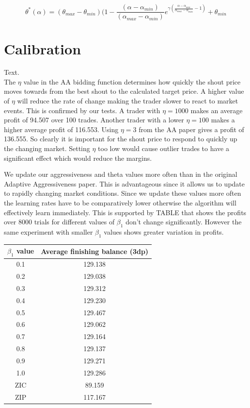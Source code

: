 \documentclass{acm_proc_article-sp}
\begin{document}
\begin{equation}
\theta^*(\alpha) = (\theta_{max}-\theta_{min})
(1-\frac{(\alpha-\alpha_{min})}{(\alpha_{max} -\alpha_{min})}e^{\gamma(
\frac{\alpha-\alpha_{min}}{\alpha_{max}-\alpha_{min}}-1)} + \theta_{min}
\label{thetastar}
\end{equation}

\section{Calibration} \label{sec:calibration}
Text.\\

The $\eta$ value in the AA bidding function determines how quickly the shout
price moves towards from the best shout to the calculated target price. A
higher value of $\eta$ will reduce the rate of change making the trader slower
to react to market events. This is confirmed by our tests. A trader with $\eta
= 1000$ makes an average profit of 94.507 over 100 trades. Another trader with
a lower $\eta = 100$ makes a higher average profit of 116.553. Using $\eta = 3$
from the AA paper gives a profit of 136.555. So clearly it is important for the
shout price to respond to quickly up the changing market. Setting $\eta$ too
low would cause outlier trades to have a significant effect which would reduce
the margins.

We update our aggressiveness and theta values more often than in the original Adaptive Aggressiveness paper\cite{AA_thesis}. This is advantageous since it allows us to update to rapidly changing market conditions. Since we update these values more often the learning rates have to be comparatively lower otherwise the algorithm will effectively learn immediately. This is supported by TABLE that shows the profits over 8000 trials for different values of $\beta_1$ don't change significantly. However the same experiment with smaller $\beta_1$ values shows greater variation in profits.

\begin{table}
  \centering
  \label{tbl:beta1_results_big}
  \begin{tabular}{ | c | c | }
    \hline
    \textbf{$\beta_1$ value} & \textbf{Average finishing balance (3dp)} \\
    \hline
    0.1 & 129.138 \\
    0.2 & 129.038 \\
    0.3 & 129.312 \\
    0.4 & 129.230 \\
    0.5 & 129.467 \\
    0.6 & 129.062 \\
    0.7 & 129.164 \\
    0.8 & 129.137 \\
    0.9 & 129.271 \\
    1.0 & 129.286 \\
    \hline \hline
    ZIC & 89.159 \\
    ZIP & 117.167 \\
    \hline
  \end{tabular}
\end{table}
\end{document}

